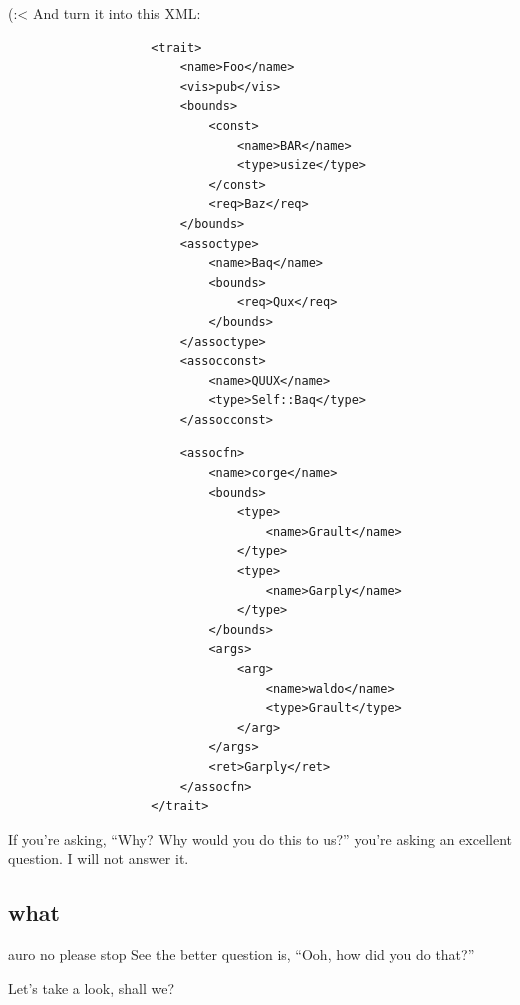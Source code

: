 \documentclass{beamer}
\begin{document}
	\begin{frame}[fragile]{(:<}
		And turn it into this XML:
		\begin{center}
			\begin{minipage}{0.45\linewidth}
				\begin{verbatim}
					<trait>
						<name>Foo</name>
						<vis>pub</vis>
						<bounds>
							<const>
								<name>BAR</name>
								<type>usize</type>
							</const>
							<req>Baz</req>
						</bounds>
						<assoctype>
							<name>Baq</name>
							<bounds>
								<req>Qux</req>
							</bounds>
						</assoctype>
						<assocconst>
							<name>QUUX</name>
							<type>Self::Baq</type>
						</assocconst>
				\end{verbatim}
			\end{minipage}
			\hfill
			\begin{minipage}{0.45\linewidth}
				\begin{verbatim}
						<assocfn>
							<name>corge</name>
							<bounds>
								<type>
									<name>Grault</name>
								</type>
								<type>
									<name>Garply</name>
								</type>
							</bounds>
							<args>
								<arg>
									<name>waldo</name>
									<type>Grault</type>
								</arg>
							</args>
							<ret>Garply</ret>
						</assocfn>
					</trait>
				\end{verbatim}
			\end{minipage}
		\end{center}

		\pause

		If you're asking, ``Why? Why would you do this to us?'' you're asking an excellent question.
		\pause I will not answer it.
	\end{frame}

	\subsection{what}
	\begin{frame}{auro no please stop}
		See the better question is, ``Ooh, how did you do that?'' \\

		\pause

		Let's take a look, shall we?
	\end{frame}
\end{document}
